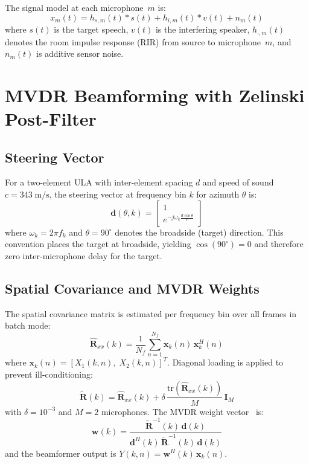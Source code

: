 \documentclass[a4paper]{article}
\begin{document}
The signal model at each microphone~$m$ is:
\begin{equation}
x_m(t) = h_{s,m}(t)*s(t) + h_{i,m}(t)*v(t) + n_m(t)
\label{eq:signal_model}
\end{equation}
where $s(t)$ is the target speech, $v(t)$ is the interfering speaker,
$h_{\cdot,m}(t)$ denotes the room impulse response (RIR) from source to
microphone~$m$, and $n_m(t)$ is additive sensor noise.

\section{MVDR Beamforming with Zelinski Post-Filter}
\label{sec:bf}

\subsection{Steering Vector}
\label{sec:steer}

For a two-element ULA with inter-element spacing $d$ and speed of sound
$c=343\;\text{m/s}$, the steering vector at frequency bin $k$ for azimuth
$\theta$ is:
\begin{equation}
\mathbf{d}(\theta,k) =
\begin{bmatrix} 1 \\ e^{-j\omega_k \frac{d\cos\theta}{c}} \end{bmatrix}
\label{eq:steering}
\end{equation}
where $\omega_k = 2\pi f_k$ and $\theta=90^\circ$ denotes the broadside
(target) direction.  This convention places the target at broadside, yielding
$\cos(90^\circ)=0$ and therefore zero inter-microphone delay for the target.

\subsection{Spatial Covariance and MVDR Weights}
\label{sec:mvdr}

The spatial covariance matrix is estimated per frequency bin over all frames
in batch mode:
\begin{equation}
\hat{\mathbf{R}}_{xx}(k) = \frac{1}{N_f} \sum_{n=1}^{N_f}
\mathbf{x}_k(n)\,\mathbf{x}_k^H(n)
\label{eq:cov}
\end{equation}
where $\mathbf{x}_k(n) = [X_1(k,n),\;X_2(k,n)]^T$.  Diagonal loading is
applied to prevent ill-conditioning:
\begin{equation}
\tilde{\mathbf{R}}(k) = \hat{\mathbf{R}}_{xx}(k) +
\delta\,\frac{\text{tr}(\hat{\mathbf{R}}_{xx}(k))}{M}\,\mathbf{I}_M
\label{eq:diag_load}
\end{equation}
with $\delta=10^{-3}$ and $M=2$ microphones.  The MVDR weight
vector~\cite{capon1969mvdr} is:
\begin{equation}
\mathbf{w}(k) = \frac{\tilde{\mathbf{R}}^{-1}(k)\,\mathbf{d}(k)}
{\mathbf{d}^H(k)\,\tilde{\mathbf{R}}^{-1}(k)\,\mathbf{d}(k)}
\label{eq:mvdr}
\end{equation}
and the beamformer output is $Y(k,n) = \mathbf{w}^H(k)\,\mathbf{x}_k(n)$.
\end{document}
